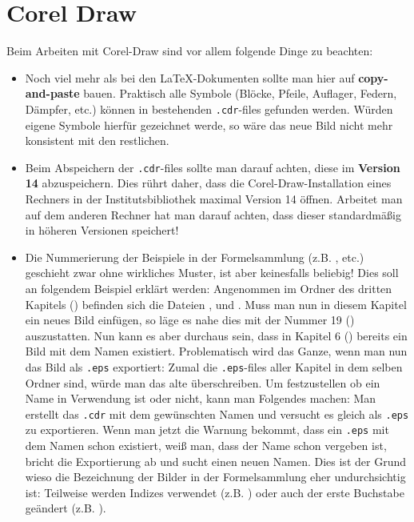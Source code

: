 \chapter{Corel Draw}

Beim Arbeiten mit Corel-Draw sind vor allem folgende Dinge zu beachten:

\begin{itemize}
  \item Noch viel mehr als bei den \LaTeX-Dokumenten sollte man hier auf
    {\bf copy-and-paste} bauen. Praktisch alle Symbole (Blöcke, Pfeile,
    Auflager, Federn, Dämpfer, etc.) können in bestehenden {\tt .cdr}-files
    gefunden werden. Würden eigene Symbole hierfür gezeichnet werde, so wäre das
    neue Bild nicht mehr konsistent mit den restlichen.
  \item Beim Abspeichern der {\tt .cdr}-files sollte man darauf achten, diese
    im {\bf Version 14} abzuspeichern. Dies rührt daher, dass die 
    Corel-Draw-Installation eines Rechners in der Institutsbibliothek maximal
    Version 14 öffnen. Arbeitet man auf dem anderen Rechner hat man darauf
    achten, dass dieser standardmäßig in höheren Versionen speichert!
  \item Die Nummerierung der Beispiele in der Formelsammlung (z.B.
    , etc.) geschieht zwar ohne wirkliches Muster, ist aber 
    keinesfalls beliebig! Dies soll an folgendem Beispiel erklärt werden: 
    Angenommen im Ordner des dritten Kapitels
    () befinden sich die Dateien 
    ,  und . Muss man nun in 
    diesem Kapitel ein neues Bild einfügen, so läge es nahe dies mit der Nummer
    19 () auszustatten. Nun kann es aber durchaus sein, dass in 
    Kapitel 6 () bereits ein Bild mit dem Namen
     existiert. Problematisch wird das Ganze, wenn
    man nun das Bild als {\tt .eps} exportiert: Zumal die {\tt .eps}-files
    aller Kapitel in dem selben Ordner sind, würde man das alte überschreiben.
    Um festzustellen ob ein Name in Verwendung ist oder nicht, kann man 
    Folgendes machen: Man erstellt das {\tt .cdr} mit dem gewünschten Namen
    und versucht es gleich als {\tt .eps} zu exportieren. Wenn man jetzt die 
    Warnung bekommt, dass ein {\tt .eps} mit dem Namen schon existiert, weiß 
    man, dass der Name schon vergeben ist, bricht die Exportierung ab und sucht
    einen neuen Namen. Dies ist der Grund wieso die Bezeichnung der Bilder in
    der Formelsammlung eher undurchsichtig ist: Teilweise werden Indizes 
    verwendet (z.B. ) oder auch der erste Buchstabe geändert
    (z.B. ).
\end{itemize}

